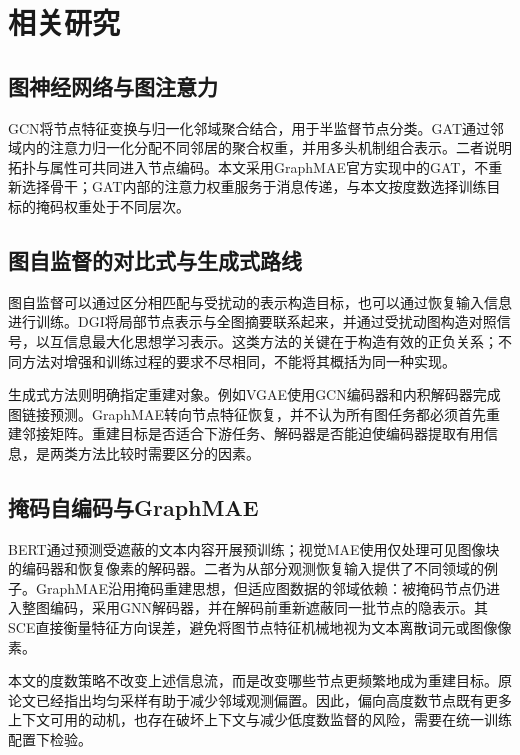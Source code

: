 \section{相关研究}\label{sec:related}
\subsection{图神经网络与图注意力}
GCN将节点特征变换与归一化邻域聚合结合，用于半监督节点分类\cite{kipf2017gcn}。GAT通过邻域内的注意力归一化分配不同邻居的聚合权重，并用多头机制组合表示\cite{velickovic2018gat}。二者说明拓扑与属性可共同进入节点编码。本文采用GraphMAE官方实现中的GAT，不重新选择骨干；GAT内部的注意力权重服务于消息传递，与本文按度数选择训练目标的掩码权重处于不同层次。

\subsection{图自监督的对比式与生成式路线}
图自监督可以通过区分相匹配与受扰动的表示构造目标，也可以通过恢复输入信息进行训练。DGI将局部节点表示与全图摘要联系起来，并通过受扰动图构造对照信号，以互信息最大化思想学习表示\cite{velickovic2019dgi}。这类方法的关键在于构造有效的正负关系；不同方法对增强和训练过程的要求不尽相同，不能将其概括为同一种实现。

生成式方法则明确指定重建对象。例如VGAE使用GCN编码器和内积解码器完成图链接预测\cite{kipf2016vgae}。GraphMAE转向节点特征恢复，并不认为所有图任务都必须首先重建邻接矩阵。重建目标是否适合下游任务、解码器是否能迫使编码器提取有用信息，是两类方法比较时需要区分的因素。

\subsection{掩码自编码与GraphMAE}
BERT通过预测受遮蔽的文本内容开展预训练\cite{devlin2019bert}；视觉MAE使用仅处理可见图像块的编码器和恢复像素的解码器\cite{he2022mae}。二者为从部分观测恢复输入提供了不同领域的例子。GraphMAE沿用掩码重建思想，但适应图数据的邻域依赖：被掩码节点仍进入整图编码，采用GNN解码器，并在解码前重新遮蔽同一批节点的隐表示。其SCE直接衡量特征方向误差，避免将图节点特征机械地视为文本离散词元或图像像素。

本文的度数策略不改变上述信息流，而是改变哪些节点更频繁地成为重建目标。原论文已经指出均匀采样有助于减少邻域观测偏置。因此，偏向高度数节点既有更多上下文可用的动机，也存在破坏上下文与减少低度数监督的风险，需要在统一训练配置下检验。
